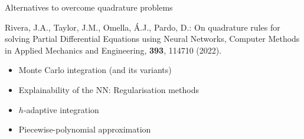 \begin{frame}{Alternatives to overcome quadrature problems}


\begin{thebibliography}{1}
Rivera, J.A., Taylor, J.M., Omella, Á.J., Pardo, D.: On quadrature rules for solving Partial Differential Equations using Neural Networks, Computer Methods in Applied Mechanics and Engineering, \textbf{393}, 114710 (2022).
\end{thebibliography}

\vspace{0.7cm}

\begin{itemize}
\item Monte Carlo integration (and its variants)
\vspace{0.2cm}
\item Explainability of the NN: Regularisation methods
\vspace{0.2cm}
\item $h$-adaptive integration
\vspace{0.2cm}
\item Piecewise-polynomial approximation
\end{itemize}


\end{frame}
